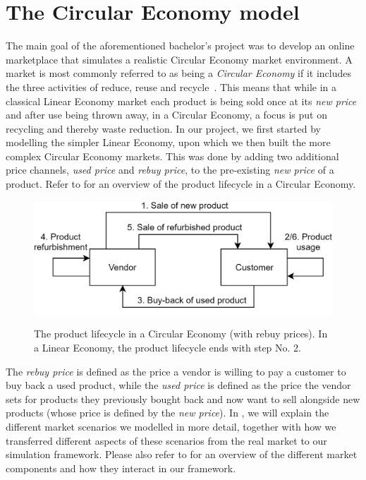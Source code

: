 \clearpage
\section{The Circular Economy model}\label{sec:CircularEconomy}

The main goal of the aforementioned bachelor's project was to develop an online marketplace that simulates a realistic Circular Economy market environment. A market is most commonly referred to as being a \emph{Circular Economy} if it includes the three activities of reduce, reuse and recycle~\cite{circularEconomyDefinition}. This means that while in a classical Linear Economy market each product is being sold once at its \emph{new price} and after use being thrown away, in a Circular Economy, a focus is put on recycling and thereby waste reduction. In our project, we first started by modelling the simpler Linear Economy, upon which we then built the more complex Circular Economy markets. This was done by adding two additional price channels, \emph{used price} and \emph{rebuy price}, to the pre-existing \emph{new price} of a product. Refer to  for an overview of the product lifecycle in a Circular Economy.

\begin{figure}[t]
	\centering
	\includegraphics[width = \textwidth]{images/product_lifecycle.png}\\
	\caption{The product lifecycle in a Circular Economy (with rebuy prices). In a Linear Economy, the product lifecycle ends with step No. 2.\\ }\label{fig:IntroMarketDynamics}
\end{figure}

The \emph{rebuy price} is defined as the price a vendor is willing to pay a customer to buy back a used product, while the \emph{used price} is defined as the price the vendor sets for products they previously bought back and now want to sell alongside new products (whose price is defined by the \emph{new price}). In , we will explain the different market scenarios we modelled in more detail, together with how we transferred different aspects of these scenarios from the real market to our simulation framework. Please also refer to  for an overview of the different market components and how they interact in our framework.

